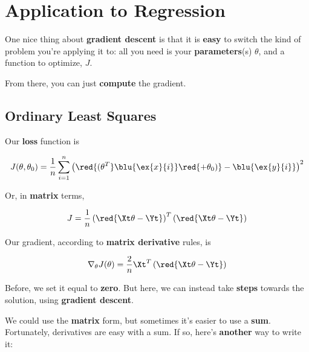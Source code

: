 \section*{Application to Regression}
    
    One nice thing about \textbf{gradient descent} is that it is \textbf{easy} to switch the kind of problem you're applying it to: all you need is your \textbf{parameters}(s) $\theta$, and a function to optimize, $J$.
    
    From there, you can just \textbf{compute} the gradient.

    \subsection*{Ordinary Least Squares}
        
        Our \textbf{loss} function is
        
        \begin{equation}
            J(\theta,\theta_0) = 
            \frac{1}{n}  \sum_{i=1}^n 
            \left( \red{ (\theta^T} \blu{\ex{x}{i}} \red{ + \theta_0) } 
            - \blu{\ex{y}{i}} \right)^2 
        \end{equation}
            
        Or, in \textbf{matrix} terms,
        
        \begin{equation*}
            J = \frac{1}{n}
                \left( \red{ \Xt \theta  - \Yt } \right)^T
                \left( \red{ \Xt \theta  - \Yt } \right) 
        \end{equation*}
        
        Our gradient, according to \textbf{matrix derivative} rules, is
        
        \begin{equation}
            \nabla_\theta J(\theta) = 
                \frac{2}{n} \Xt^T
                \left( \red{ \Xt \theta  - \Yt } \right) 
        \end{equation}
        
        Before, we set it equal to \textbf{zero}. But here, we can instead take \textbf{steps} towards the solution, using \textbf{gradient descent}.
        
        We could use the \textbf{matrix} form, but sometimes it's easier to use a \textbf{sum}. Fortunately, derivatives are easy with a sum. If so, here's \textbf{another} way to write it:
        
